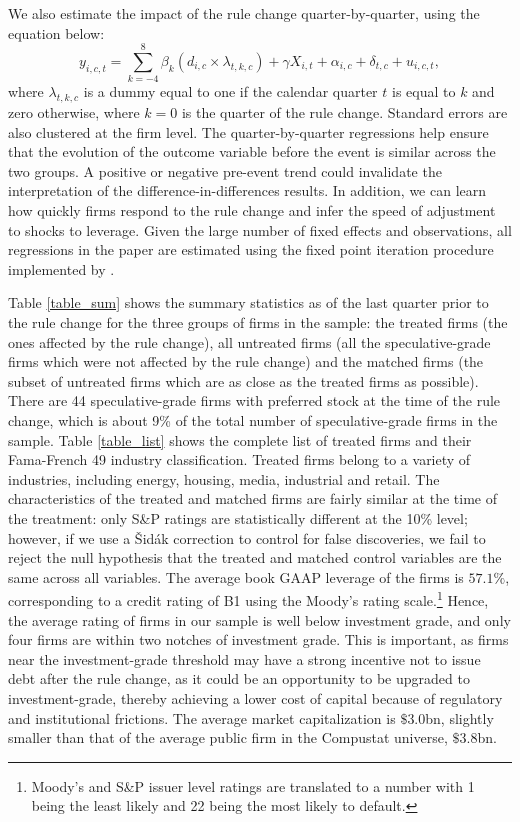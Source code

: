 \documentclass[a4paper, 12pt]{article}
\begin{document}
We also estimate the impact of the rule change quarter-by-quarter, using the equation below:
	\begin{equation} \label{coefficients}
	y_{i,c,t}=\sum_{k=-4}^{8} \beta_k (d_{i,c} \times \lambda_{t,k,c}) + \gamma X_{i,t} + \alpha_{i,c} + \delta_{t,c} + u_{i,c,t},
	\end{equation}
where $\lambda_{t,k,c}$ is a dummy equal to one if the calendar quarter $t$ is equal to $k$ and zero otherwise, where $k=0$ is the quarter of the rule change. Standard errors are also clustered at the firm level. The quarter-by-quarter regressions help ensure that the evolution of the outcome variable before the event is similar across the two groups. A positive or negative pre-event trend could invalidate the interpretation of the difference-in-differences results. In addition, we can learn how quickly firms respond to the rule change and infer the speed of adjustment to shocks to leverage.  Given the large number of fixed effects and observations, all regressions in the paper are estimated using the fixed point iteration procedure implemented by \citet{Correia2017:HDFE}.

Table \ref{table_sum} shows the summary statistics as of the last quarter prior to the rule change for the three groups of firms in the sample: the treated firms (the ones affected by the rule change), all untreated firms (all the speculative-grade firms which were not affected by the rule change) and the matched firms (the subset of untreated firms which are as close as the treated firms as possible). There are 44 speculative-grade firms with preferred stock at the time of the rule change, which is about 9\% of the total number of speculative-grade firms in the sample. Table \ref{table_list} shows the complete list of treated firms and their Fama-French 49 industry classification. Treated firms belong to a variety of industries, including energy, housing, media, industrial and retail. The characteristics of the treated and matched firms are fairly similar at the time of the treatment: only S\&P ratings are statistically different at the 10\% level; however, if we use a Šidák correction to control for false discoveries, we fail to reject the null hypothesis that the treated and matched control variables are the same across all variables. The average book GAAP leverage of the firms is $57.1\%$, corresponding to a credit rating of B1 using the Moody's rating scale.\footnote{Moody's and S\&P issuer level ratings are translated to a number with 1 being the least likely and 22 being the most likely to default.} Hence, the average rating of firms in our sample is well below investment grade, and only four firms are within two notches of investment grade. This is important, as firms near the investment-grade threshold may have a strong incentive not to issue debt after the rule change, as it could be an opportunity to be upgraded to investment-grade, thereby achieving a lower cost of capital because of regulatory and institutional frictions. The average market capitalization is $\$3.0$bn, slightly smaller than that of the average public firm in the Compustat universe, $\$3.8$bn.
\end{document}
